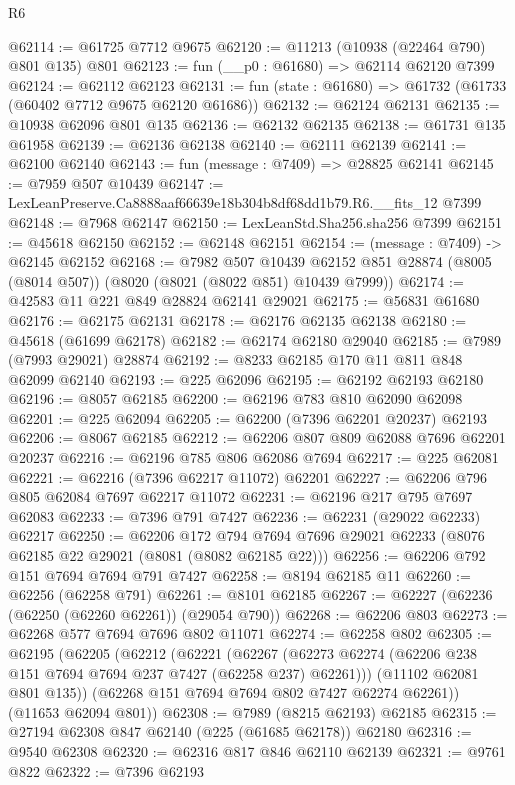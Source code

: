 \begin{lexlean}{R6}
\begin{coremodule}
@62114 := @61725 @7712 @9675
@62120 := @11213 (@10938 (@22464 @790) @801 @135) @801
@62123 := fun (__p0 : @61680) => @62114 @62120 @7399
@62124 := @62112 @62123
@62131 := fun (state : @61680) => @61732 (@61733 (@60402 @7712 @9675 @62120 @61686))
@62132 := @62124 @62131
@62135 := @10938 @62096 @801 @135
@62136 := @62132 @62135
@62138 := @61731 @135 @61958
@62139 := @62136 @62138
@62140 := @62111 @62139
@62141 := @62100 @62140
@62143 := fun (message : @7409) => @28825 @62141
@62145 := @7959 @507 @10439
@62147 := LexLeanPreserve.Ca8888aaf66639e18b304b8df68dd1b79.R6.__fits_12 @7399
@62148 := @7968 @62147
@62150 := LexLeanStd.Sha256.sha256 @7399
@62151 := @45618 @62150
@62152 := @62148 @62151
@62154 := (message : @7409) -> @62145 @62152
@62168 := @7982
    @507
    @10439
    @62152
    @851
    @28874
    (@8005 (@8014 @507))
    (@8020 (@8021 (@8022 @851) @10439 @7999))
@62174 := @42583 @11 @221 @849 @28824 @62141 @29021
@62175 := @56831 @61680
@62176 := @62175 @62131
@62178 := @62176 @62135 @62138
@62180 := @45618 (@61699 @62178)
@62182 := @62174 @62180 @29040
@62185 := @7989 (@7993 @29021) @28874
@62192 := @8233 @62185 @170 @11 @811 @848 @62099 @62140
@62193 := @225 @62096
@62195 := @62192 @62193 @62180
@62196 := @8057 @62185
@62200 := @62196 @783 @810 @62090 @62098
@62201 := @225 @62094
@62205 := @62200 (@7396 @62201 @20237) @62193
@62206 := @8067 @62185
@62212 := @62206 @807 @809 @62088 @7696 @62201 @20237
@62216 := @62196 @785 @806 @62086 @7694
@62217 := @225 @62081
@62221 := @62216 (@7396 @62217 @11072) @62201
@62227 := @62206 @796 @805 @62084 @7697 @62217 @11072
@62231 := @62196 @217 @795 @7697 @62083
@62233 := @7396 @791 @7427
@62236 := @62231 (@29022 @62233) @62217
@62250 := @62206
    @172
    @794
    @7694
    @7696
    @29021
    @62233
    (@8076 @62185 @22 @29021 (@8081 (@8082 @62185 @22)))
@62256 := @62206 @792 @151 @7694 @7694 @791 @7427
@62258 := @8194 @62185 @11
@62260 := @62256 (@62258 @791)
@62261 := @8101 @62185
@62267 := @62227 (@62236 (@62250 (@62260 @62261)) (@29054 @790))
@62268 := @62206 @803
@62273 := @62268 @577 @7694 @7696 @802 @11071
@62274 := @62258 @802
@62305 := @62195
    (@62205
      (@62212
        (@62221
          (@62267 (@62273 @62274 (@62206 @238 @151 @7694 @7694 @237 @7427 (@62258 @237) @62261)))
          (@11102 @62081 @801 @135))
        (@62268 @151 @7694 @7694 @802 @7427 @62274 @62261))
      (@11653 @62094 @801))
@62308 := @7989 (@8215 @62193) @62185
@62315 := @27194 @62308 @847 @62140 (@225 (@61685 @62178)) @62180
@62316 := @9540 @62308
@62320 := @62316 @817 @846 @62110 @62139
@62321 := @9761 @822
@62322 := @7396 @62193

\end{coremodule}
\end{lexlean}
